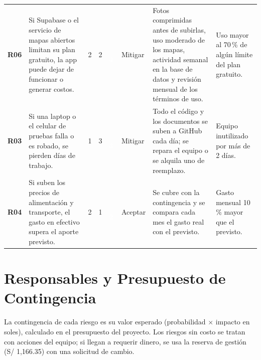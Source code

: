 \documentclass[11pt,a4paper]{article}
\newcommand{\etiqueta}[2]{{\setlength{\fboxsep}{2pt}\colorbox{#1}{\textcolor{white}{\scriptsize\bfseries #2}}}}
\begin{document}
{\begin{longtable}{@{}P{0.75cm} >{\raggedright\arraybackslash}p{3.35cm} C{0.45cm} C{0.45cm} C{0.85cm} P{1.45cm} >{\raggedright\arraybackslash}p{3.9cm} >{\raggedright\arraybackslash}p{2.45cm}@{}}
\textbf{R06} & Si Supabase o el servicio de mapas abiertos limitan su plan gratuito, la app puede dejar de funcionar o generar costos. & 2 & 2 & \etiqueta{SevMedia}{\,4\,} & Mitigar & Fotos comprimidas antes de subirlas, uso moderado de los mapas, actividad semanal en la base de datos y revisión mensual de los términos de uso. & Uso mayor al 70\,\% de algún límite del plan gratuito. \\
\textbf{R03} & Si una laptop o el celular de pruebas falla o es robado, se pierden días de trabajo. & 1 & 3 & \etiqueta{SevMedia}{\,3\,} & Mitigar & Todo el código y los documentos se suben a GitHub cada día; se repara el equipo o se alquila uno de reemplazo. & Equipo inutilizado por más de 2 días. \\
\textbf{R04} & Si suben los precios de alimentación y transporte, el gasto en efectivo supera el aporte previsto. & 2 & 1 & \etiqueta{SevBaja}{\,2\,} & Aceptar & Se cubre con la contingencia y se compara cada mes el gasto real con el previsto. & Gasto mensual 10\,\% mayor que el previsto. \\
\end{longtable}
}

\section{Responsables y Presupuesto de Contingencia}
La contingencia de cada riesgo es su valor esperado (probabilidad $\times$ impacto en soles), calculado en el presupuesto del proyecto. Los riesgos sin costo se tratan con acciones del equipo; si llegan a requerir dinero, se usa la reserva de gestión (S/ 1,166.35) con una solicitud de cambio.
\end{document}
